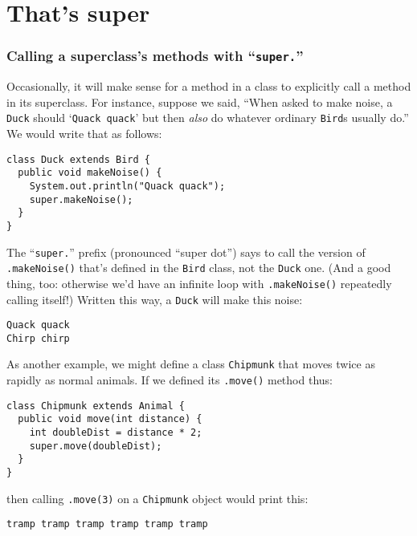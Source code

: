 \section{That's super}

\subsubsection{Calling a superclass's methods with ``\texttt{super.}''}

Occasionally, it will make sense for a method in a class to explicitly call a
method in its superclass. For instance, suppose we said, ``When asked to make
noise, a \texttt{Duck} should `\texttt{Quack quack}' but then \textit{also} do
whatever ordinary \texttt{Bird}s usually do.'' We would write that as follows:

\begin{Verbatim}[fontsize=\footnotesize,samepage=true,frame=single]
class Duck extends Bird {
  public void makeNoise() {
    System.out.println("Quack quack");
    super.makeNoise();
  }
}
\end{Verbatim}

The ``\texttt{super.}'' prefix (pronounced ``super dot'') says to call the
version of \texttt{.makeNoise()} that's defined in the \texttt{Bird}
class, not the \texttt{Duck} one. (And a good thing, too: otherwise we'd have
an infinite loop with \texttt{.makeNoise()} repeatedly calling itself!)
Written this way, a \texttt{Duck} will make this noise:

\begin{Verbatim}[fontsize=\small,samepage=true,frame=single]
Quack quack
Chirp chirp
\end{Verbatim}

As another example, we might define a class \texttt{Chipmunk} that moves twice
as rapidly as normal animals. If we defined its \texttt{.move()} method thus:

\begin{Verbatim}[fontsize=\footnotesize,samepage=true,frame=single]
class Chipmunk extends Animal {
  public void move(int distance) {
    int doubleDist = distance * 2;
    super.move(doubleDist);
  }
}
\end{Verbatim}

then calling \texttt{.move(3)} on a \texttt{Chipmunk} object would print this:

\begin{Verbatim}[fontsize=\small,samepage=true,frame=single]
tramp tramp tramp tramp tramp tramp
\end{Verbatim}

